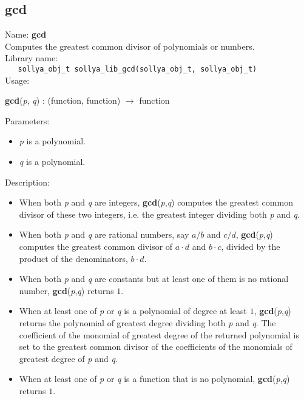 \subsection{gcd}
\label{labgcd}
\noindent Name: \textbf{gcd}\\
\phantom{aaa}Computes the greatest common divisor of polynomials or numbers.\\[0.2cm]
\noindent Library name:\\
\verb|   sollya_obj_t sollya_lib_gcd(sollya_obj_t, sollya_obj_t)|\\[0.2cm]
\noindent Usage: 
\begin{center}
\textbf{gcd}(\emph{p}, \emph{q}) : (\textsf{function}, \textsf{function}) $\rightarrow$ \textsf{function}\\
\end{center}
Parameters: 
\begin{itemize}
\item \emph{p} is a polynomial.
\item \emph{q} is a polynomial.
\end{itemize}
\noindent Description: \begin{itemize}

\item When both \emph{p} and \emph{q} are integers, \textbf{gcd}(\emph{p},\emph{q}) computes the
   greatest common divisor of these two integers, i.e. the greatest
   integer dividing both \emph{p} and \emph{q}.

\item When both \emph{p} and \emph{q} are rational numbers, say $a/b$ and
   $c/d$, \textbf{gcd}(\emph{p},\emph{q}) computes the greatest common divisor
   of $a \cdot d$ and $b \cdot c$, divided by the
   product of the denominators, $b \cdot d$.

\item When both \emph{p} and \emph{q} are constants but at least one of them is
   no rational number, \textbf{gcd}(\emph{p},\emph{q}) returns $1$.

\item When at least one of \emph{p} or \emph{q} is a polynomial of degree at least
   $1$, \textbf{gcd}(\emph{p},\emph{q}) returns the polynomial of greatest degree
   dividing both \emph{p} and \emph{q}. The coefficient of the monomial of greatest
   degree of the returned polynomial is set to the greatest common
   divisor of the coefficients of the monomials of greatest degree of \emph{p}
   and \emph{q}.

\item When at least one of \emph{p} or \emph{q} is a function that is no polynomial,
   \textbf{gcd}(\emph{p},\emph{q}) returns $1$.
\end{itemize}
